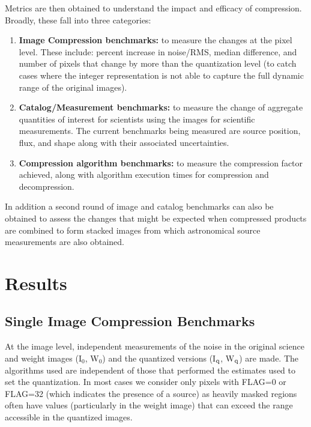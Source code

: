 Metrics are then obtained to understand the impact and efficacy of compression.  Broadly, 
these fall into three categories:
\begin{enumerate}
\item {\bf Image Compression benchmarks:} to measure the changes at the pixel level.  These
include: percent increase in noise/RMS, median difference, and number of pixels that change
by more than the quantization level (to catch cases where the integer representation is not 
able to capture the full dynamic range of the original images).

\item {\bf Catalog/Measurement benchmarks:} to measure the change of aggregate quantities
of interest for scientists using the images for scientific measurements.  The current
benchmarks being measured are source position, flux, and shape along with their associated
uncertainties.

\item {\bf Compression algorithm benchmarks:} to measure the compression factor achieved, along with
algorithm execution times for compression and decompression.
\end{enumerate}
In addition a second round of image and catalog benchmarks can also be obtained to assess
the changes that might be expected when compressed products are combined to form stacked
images from which astronomical source measurements are also obtained.



\section{Results}

\subsection{Single Image Compression Benchmarks}

At the image level, independent measurements of the noise in the original science 
and weight images (I$_{0}$, W$_{0}$) and the quantized versions (I$_{\rm q}$, W$_{\rm q}$) are made.
The algorithms used are independent of those that performed the estimates used to set the quantization.
In most cases we consider only pixels with FLAG=0 or FLAG=32 (which indicates the presence of a source)
as heavily masked regions often have values (particularly in the weight image) that can exceed the 
range accessible in the quantized images.  

